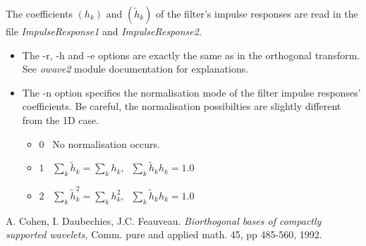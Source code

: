The coefficients $(h_{k})$ and $(\tilde{h}_{k})$ of the filter's impulse responses are read in the file {\em ImpulseResponse1} and {\em ImpulseResponse2}.

\begin{itemize}
\item
The -r, -h and -e options are exactly the same as in the orthogonal transform.
See {\em owave2} module documentation for explanations. 
\item
The -n option specifies the normalisation mode of the filter impulse responses' coefficients. Be careful, the normalisation possibilties are slightly different from the 1D case.
\begin{itemize}
\item
$0$ \ No normalisation occurs.
\item
$1$ \ $ \sum_{k} \tilde{h}_{k} =  \sum_{k} {h}_{k}, \;\;  \sum_{k} \tilde{h}_{k}{h}_{k} = 1.0$
\item 
$2$ \ $ \sum_{k} \tilde{h}_{k}^2 =  \sum_{k} {h}_{k}^2, \;\;  \sum_{k} \tilde{h}_{k}{h}_{k} = 1.0$
\end{itemize}

\end{itemize}


\begin{thebibliography}{CDF}

 A. Cohen, I. Daubechies, J.C. Feauveau. 
{\em Biorthogonal bases of compactly supported wavelets, } 
Comm. pure and applied math. 45, pp 485-560, 1992.

\end{thebibliography}




\parindent 0.0cm 
\parskip 0.0cm
